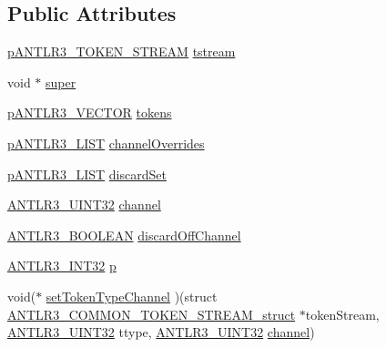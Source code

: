 \subsection*{Public Attributes}
\begin{DoxyCompactItemize}
\item 
\hyperlink{antlr3interfaces_8h_a9daa2d452cf7fb0c1f4b5e153266070c}{p\-A\-N\-T\-L\-R3\-\_\-\-T\-O\-K\-E\-N\-\_\-\-S\-T\-R\-E\-A\-M} \hyperlink{struct_a_n_t_l_r3___c_o_m_m_o_n___t_o_k_e_n___s_t_r_e_a_m__struct_ad4ac4cf969cb48478aa44f7c708226e2}{tstream}
\item 
void $\ast$ \hyperlink{struct_a_n_t_l_r3___c_o_m_m_o_n___t_o_k_e_n___s_t_r_e_a_m__struct_ae313a96c7edf6e543f6c6c8cda1568cf}{super}
\item 
\hyperlink{antlr3interfaces_8h_a0dfeeada7529fbe1b968be84079b828f}{p\-A\-N\-T\-L\-R3\-\_\-\-V\-E\-C\-T\-O\-R} \hyperlink{struct_a_n_t_l_r3___c_o_m_m_o_n___t_o_k_e_n___s_t_r_e_a_m__struct_ab1fb3f1cecceebdc61d838277670a7f0}{tokens}
\item 
\hyperlink{antlr3interfaces_8h_ae2fcb7565c1f2a85d99e61299f33fbf1}{p\-A\-N\-T\-L\-R3\-\_\-\-L\-I\-S\-T} \hyperlink{struct_a_n_t_l_r3___c_o_m_m_o_n___t_o_k_e_n___s_t_r_e_a_m__struct_a6002a039b9758a44262ad424a1652a7b}{channel\-Overrides}
\item 
\hyperlink{antlr3interfaces_8h_ae2fcb7565c1f2a85d99e61299f33fbf1}{p\-A\-N\-T\-L\-R3\-\_\-\-L\-I\-S\-T} \hyperlink{struct_a_n_t_l_r3___c_o_m_m_o_n___t_o_k_e_n___s_t_r_e_a_m__struct_a253949433cc0cae9544687a2f9e1facd}{discard\-Set}
\item 
\hyperlink{antlr3defs_8h_ac41f744abd0fd25144b9eb9d11b1dfd1}{A\-N\-T\-L\-R3\-\_\-\-U\-I\-N\-T32} \hyperlink{struct_a_n_t_l_r3___c_o_m_m_o_n___t_o_k_e_n___s_t_r_e_a_m__struct_a0d9d2e70946a56bb76f6748d55c80372}{channel}
\item 
\hyperlink{antlr3defs_8h_a5b33dccbba3b7212539695e21df4079b}{A\-N\-T\-L\-R3\-\_\-\-B\-O\-O\-L\-E\-A\-N} \hyperlink{struct_a_n_t_l_r3___c_o_m_m_o_n___t_o_k_e_n___s_t_r_e_a_m__struct_acafcfb5efa9233c6f5b51a48b81d3eb2}{discard\-Off\-Channel}
\item 
\hyperlink{antlr3defs_8h_a6faef5c4687f8eb633d2aefea93973ca}{A\-N\-T\-L\-R3\-\_\-\-I\-N\-T32} \hyperlink{struct_a_n_t_l_r3___c_o_m_m_o_n___t_o_k_e_n___s_t_r_e_a_m__struct_a03a16d2ed34642468b22aab98dabb1d1}{p}
\item 
void($\ast$ \hyperlink{struct_a_n_t_l_r3___c_o_m_m_o_n___t_o_k_e_n___s_t_r_e_a_m__struct_a542cb45a42cb59120d49630f42a3d030}{set\-Token\-Type\-Channel} )(struct \hyperlink{struct_a_n_t_l_r3___c_o_m_m_o_n___t_o_k_e_n___s_t_r_e_a_m__struct}{A\-N\-T\-L\-R3\-\_\-\-C\-O\-M\-M\-O\-N\-\_\-\-T\-O\-K\-E\-N\-\_\-\-S\-T\-R\-E\-A\-M\-\_\-struct} $\ast$token\-Stream, \hyperlink{antlr3defs_8h_ac41f744abd0fd25144b9eb9d11b1dfd1}{A\-N\-T\-L\-R3\-\_\-\-U\-I\-N\-T32} ttype, \hyperlink{antlr3defs_8h_ac41f744abd0fd25144b9eb9d11b1dfd1}{A\-N\-T\-L\-R3\-\_\-\-U\-I\-N\-T32} \hyperlink{struct_a_n_t_l_r3___c_o_m_m_o_n___t_o_k_e_n___s_t_r_e_a_m__struct_a0d9d2e70946a56bb76f6748d55c80372}{channel})

\end{DoxyCompactItemize}
